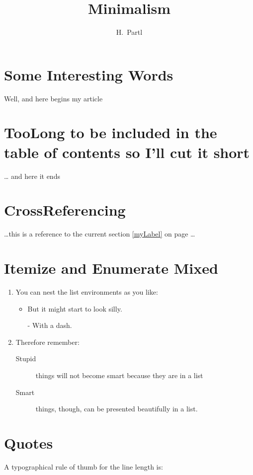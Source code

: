 \documentclass[a4paper, 11pt]{article}
\author{H.~Partl}
\title{Minimalism}
\begin{document}
\maketitle
\tableofcontents

\section{Some Interesting Words}
Well, and here begins my article
\section[ShortTitle]{TooLong to be included in the table of contents %
so I'll cut it short}
\ldots{} and here it ends %
\section{CrossReferencing}
\ldots this is a reference to %
\label{myLabel} %
the current section \ref{myLabel} %
on page \pageref{myLabel} \ldots

\section{Itemize and Enumerate Mixed}
\flushleft %
\begin{enumerate}
\item You can nest the list environments as you like:

  \begin{itemize}
  \item But it might start to look silly.
  \item[-] With a dash.
  \end{itemize}

\item Therefore remember:

  \begin{description}
  \item[Stupid] things will not become smart because they%
    are in a list
  \item[Smart] things, though, can be presented%
    beautifully in a list.
  \end{description}
\end{enumerate}

\section{Quotes}
A typographical rule of thumb for the line length is:
\end{document}
